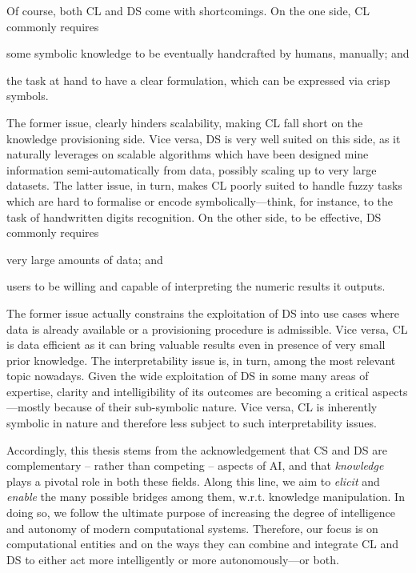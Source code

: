 \documentclass[12pt,a4paper,openright,twoside]{book}
\begin{document}
Of course, both CL and DS come with shortcomings.
%
On the one side, CL commonly requires
%
\begin{inlinelist}
    \item some symbolic knowledge to be eventually handcrafted by humans, manually; and
    \item the task at hand to have a clear formulation, which can be expressed via crisp symbols.
\end{inlinelist}
%
The former issue, clearly hinders scalability, making CL fall short on the knowledge provisioning side.
%
Vice versa, DS is very well suited on this side, as it naturally leverages on scalable algorithms which have been designed mine information semi-automatically from data, possibly scaling up to very large datasets.
%
The latter issue, in turn, makes CL poorly suited to handle fuzzy tasks which are hard to formalise or encode symbolically---think, for instance, to the task of handwritten digits recognition.
%
On the other side, to be effective, DS commonly requires
%
\begin{inlinelist}
    \item very large amounts of data; and
    \item users to be willing and capable of interpreting the numeric results it outputs.
\end{inlinelist}
%
The former issue actually constrains the exploitation of DS into use cases where data is already available or a provisioning procedure is admissible.
%
Vice versa, CL is data efficient as it can bring valuable results even in presence of very small prior knowledge.
%
The interpretability issue is, in turn, among the most relevant topic nowadays.
%
Given the wide exploitation of DS in some many areas of expertise, clarity and intelligibility of its outcomes are becoming a critical aspects---mostly because of their sub-symbolic nature.
%
Vice versa, CL is inherently symbolic in nature and therefore less subject to such interpretability issues.

Accordingly, this thesis stems from the acknowledgement that CS and DS are complementary -- rather than competing -- aspects of AI, and that \emph{knowledge} plays a pivotal role in both these fields.
%
Along this line, we aim to \emph{elicit} and \emph{enable} the many possible bridges among them, w.r.t. knowledge manipulation.
%
In doing so, we follow the ultimate purpose of increasing the degree of intelligence and autonomy of modern computational systems.
%
Therefore, our focus is on computational entities and on the ways they can combine and integrate CL and DS to either act more intelligently or more autonomously---or both.
\end{document}

